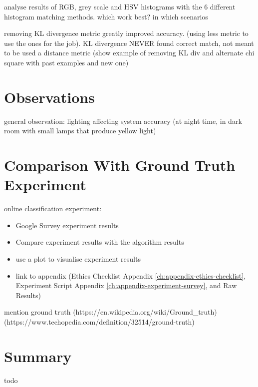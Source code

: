analyse results of RGB, grey scale and HSV histograms with the 6 different histogram matching methods. which work best? in which scenarios

removing KL divergence metric greatly improved accuracy. (using less metric to use the ones for the job). KL divergence NEVER found correct match, not meant to be used a distance metric (show example of removing KL div and alternate chi square with past examples and new one)


\section{Observations}

general observation: lighting affecting system accuracy (at night time, in dark room with small lamps that produce yellow light)


\section{Comparison With Ground Truth Experiment}

online classification experiment:
    \begin{itemize}
        \item Google Survey experiment results 
        \item Compare experiment results with the algorithm results
        \item use a plot to visualise experiment results
        \item link to appendix (Ethics Checklist Appendix \ref{ch:appendix-ethics-checklist}, Experiment Script Appendix \ref{ch:appendix-experiment-survey}, and Raw Results)
    \end{itemize}
    
mention ground truth (https://en.wikipedia.org/wiki/Ground\_truth) (https://www.techopedia.com/definition/32514/ground-truth)


\section{Summary}

todo